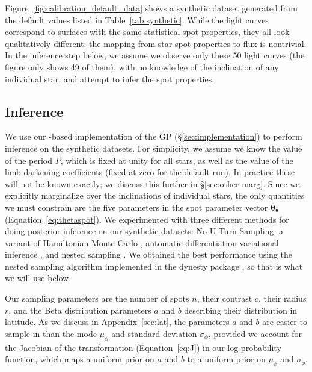 \documentclass[modern]{aastex62}
\begin{document}
Figure~\ref{fig:calibration_default_data} shows a synthetic dataset generated
from the default values listed in Table~\ref{tab:synthetic}. While the
light curves correspond to surfaces with the same statistical spot properties,
they all look qualitatively different: the mapping from star spot properties
to flux is nontrivial. In the inference step below, we assume we observe
only these 50 light curves (the figure only shows 49 of them),
with no knowledge of the inclination of any individual
star, and attempt to infer the spot properties.

\subsection{Inference}
\label{sec:calibration-inference}
We use our \Python-based implementation of the GP (\S\ref{sec:implementation})
to perform inference on the synthetic datasets. For simplicity, we assume we
know the value of the period $P$, which is fixed at unity for all stars, as well
as the value of the limb darkening coefficients (fixed at zero for the default
run). In practice these will not be known exactly; we discuss this further in
\S\ref{sec:other-marg}. Since we explicitly marginalize over the inclinations
of individual stars, the only quantities we must constrain are the five
parameters in the spot parameter vector $\pmb{\theta}_\bullet$
(Equation~\ref{eq:thetaspot}). We experimented with three different methods
for doing posterior inference on our synthetic datasets: No-U Turn Sampling,
a variant of Hamiltonian Monte Carlo
\citep[NUTS;][]{Duane1987,Hoffman2011}, automatic differentiation
variational inference \citep[ADVI;][]{Kucukelbir2016,Blei2016}, and nested sampling \citep{Skilling2004,Skilling2006}.
We obtained the best performance using the nested sampling algorithm
implemented in the \textsf{dynesty} package \citep{Speagle2020}, so that is what
we will use below.

\pagebreak

Our sampling parameters are the number of spots $n$, their contrast $c$,
their radius $r$, and the Beta distribution parameters $a$ and $b$ describing their
distribution in latitude. As we discuss in Appendix~\ref{sec:lat},
the parameters $a$ and $b$ are easier to sample in than
the mode $\mu_\phi$ and standard deviation $\sigma_\phi$, provided we
account for the Jacobian of the transformation (Equation~\ref{eq:J})
in our log probability function, which maps a uniform prior on $a$ and $b$
to a uniform prior on $\mu_\phi$ and $\sigma_\phi$.
\end{document}
